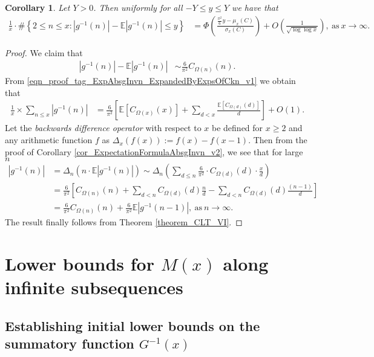 \documentclass[11pt,reqno,a4letter]{article}
\numberwithin{figure}{section}
\numberwithin{table}{section}
\theoremstyle{plain}
\newtheorem{cor}[theorem]{Corollary}
\numberwithin{theorem}{section}
\theoremstyle{definition}
\begin{document}
\begin{cor} 
\label{cor_CLT_VII} 
Let $Y > 0$. 
Then uniformly for all $-Y \leq y \leq Y$ 
we have that 
\begin{align*} 
\frac{1}{x} \cdot \#\left\{2 \leq n \leq x:|g^{-1}(n)| - 
     \mathbb{E}|g^{-1}(n)| \leq y\right\} & = 
     \Phi\left(\frac{\frac{\pi^2}{6} y - \mu_x(C)}{\sigma_x(C)}\right) + 
     O\left(\frac{1}{\sqrt{\log\log x}}\right), 
     \mathrm{\ as\ } x \rightarrow \infty. 
\end{align*} 
\end{cor} 
\begin{proof} 
We claim that 
\begin{align*} 
|g^{-1}(n)| - \mathbb{E}|g^{-1}(n)| & \sim \frac{6}{\pi^2} C_{\Omega(n)}(n). 
\end{align*} 
From \eqref{eqn_proof_tag_ExpAbsgInvn_ExpandedByExpsOfCkn_v1}
we obtain that 
\begin{align*} 
\frac{1}{x} \times \sum_{n \leq x} |g^{-1}(n)| & = 
     \frac{6}{\pi^2} \left[\mathbb{E}[C_{\Omega(x)}(x)] + \sum_{d<x} 
     \frac{\mathbb{E}[C_{\Omega(d)}(d)]}{d}\right] + O(1). 
\end{align*} 
Let the \emph{backwards difference operator} with respect to $x$ 
be defined for $x \geq 2$ and any arithmetic function $f$ as 
$\Delta_x(f(x)) := f(x) - f(x-1)$. Then from the proof of 
Corollary \ref{cor_ExpectationFormulaAbsgInvn_v2}, 
we see that for large $n$ 
\begin{align*} 
|g^{-1}(n)| & = \Delta_n(n \cdot \mathbb{E}|g^{-1}(n)|) 
     \sim \Delta_n\left(\sum_{d \leq n} \frac{6}{\pi^2} \cdot C_{\Omega(d)}(d) \cdot \frac{x}{d}\right) \\ 
     & = \frac{6}{\pi^2}\left[C_{\Omega(n)}(n) + \sum_{d < n} C_{\Omega(d)}(d) \frac{n}{d} - 
     \sum_{d<n} C_{\Omega(d)}(d) \frac{(n-1)}{d}\right] \\ 
     & = \frac{6}{\pi^2} C_{\Omega(n)}(n) + \frac{6}{\pi^2} \mathbb{E}|g^{-1}(n-1)|, 
     \mathrm{\ as\ } n \rightarrow \infty. 
\end{align*} 
The result finally follows from Theorem \ref{theorem_CLT_VI}. 
\end{proof} 

\newpage 
\section{Lower bounds for $M(x)$ along infinite subsequences} 
\label{Section_KeyApplications} 

\subsection{Establishing initial lower bounds on the summatory function $G^{-1}(x)$} 
\label{Section_ProofOfValidityOfAverageOrderLowerBounds} 
\end{document}
